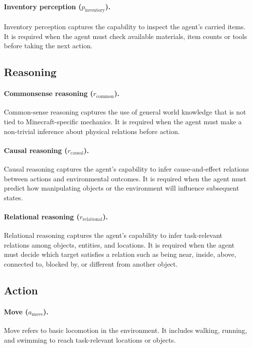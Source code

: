 \documentclass[11pt]{article}
\begin{document}
\paragraph{Inventory perception ($p_{\mathrm{inventory}}$).}
Inventory perception captures the capability to inspect the agent's carried items. 
It is required when the agent must check available materials, item counts or tools before taking the next action.

\subsection{Reasoning}

\paragraph{Commonsense reasoning ($r_{\mathrm{common}}$).}
Common-sense reasoning captures the use of general world knowledge that is not tied to Minecraft-specific mechanics. 
It is required when the agent must make a non-trivial inference about physical relations before action.

\paragraph{Causal reasoning ($r_{\mathrm{causal}}$).}
Causal reasoning captures the agent's capability to infer cause-and-effect relations between actions and environmental outcomes. 
It is required when the agent must predict how manipulating objects or the environment will influence subsequent states.

\paragraph{Relational reasoning ($r_{\mathrm{relational}}$).}
Relational reasoning captures the agent's capability to infer task-relevant relations among objects, entities, and locations. 
It is required when the agent must decide which target satisfies a relation such as being near, inside, above, connected to, blocked by, or different from another object.

\subsection{Action}

\paragraph{Move ($a_{\mathrm{move}}$).}
Move refers to basic locomotion in the environment. 
It includes walking, running, and swimming to reach task-relevant locations or objects.
\end{document}
